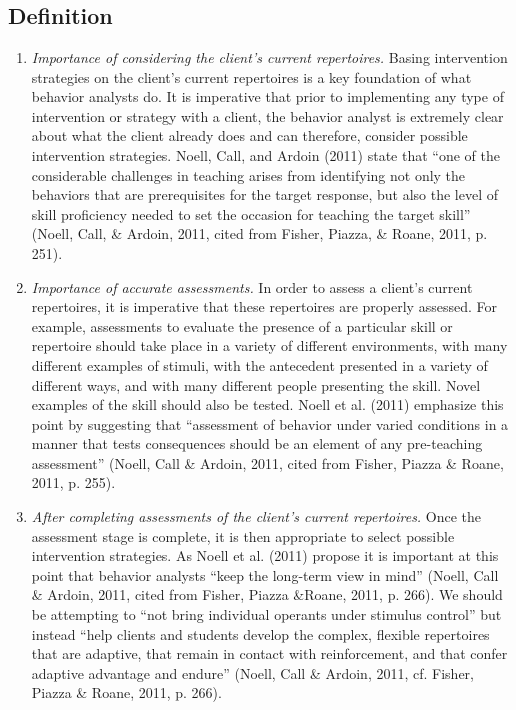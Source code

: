 \clearpage \section[\fourjFive{}]{\fourjFive{}%
              }
\subsection{Definition}
\begin{enumerate}
\item \textit{Importance of considering the client's current repertoires.} Basing intervention strategies on the client's current repertoires is a key foundation of what behavior analysts do. It is imperative that prior to implementing any type of intervention or strategy with a client, the behavior analyst is extremely clear about what the client already does and can therefore, consider possible intervention strategies. Noell, Call, and Ardoin (2011) state that ``one of the considerable challenges in teaching arises from identifying not only the behaviors that are prerequisites for the target response, but also the level of skill proficiency needed to set the occasion for teaching the target skill'' (Noell, Call, \& Ardoin, 2011, cited from Fisher, Piazza, \& Roane, 2011, p. 251).
%
\item \textit{Importance of accurate assessments.} In order to assess a client's current repertoires, it is imperative that these repertoires are properly assessed. For example, assessments to evaluate the presence of a particular skill or repertoire should take place in a variety of different environments, with many different examples of stimuli, with the antecedent presented in a variety of different ways, and with many different people presenting the skill. Novel examples of the skill should also be tested. Noell et al. (2011) emphasize this point by suggesting that ``assessment of behavior under varied conditions in a manner that tests consequences should be an element of any pre-teaching assessment'' (Noell, Call \& Ardoin, 2011, cited from Fisher, Piazza \& Roane, 2011, p. 255). 

\item \textit{After completing assessments of the client's current repertoires.} Once the assessment stage is complete, it is then appropriate to select possible intervention strategies. As Noell et al. (2011) propose it is important at this point that behavior analysts ``keep the long-term view in mind'' (Noell, Call \& Ardoin, 2011, cited from Fisher, Piazza \&Roane, 2011, p. 266).  We should be attempting to ``not bring individual operants under stimulus control'' but instead ``help clients and students develop the complex, flexible repertoires that are adaptive, that remain in contact with reinforcement, and that confer adaptive advantage and endure'' (Noell, Call \& Ardoin, 2011, cf. Fisher, Piazza \& Roane, 2011, p. 266).
%
\end{enumerate}
%
